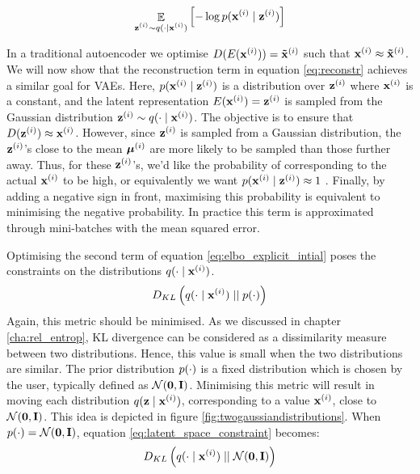 	\begin{equation}
		\mathop{\mathbb{E}}_{\substack{\mathbf{z}^{(i)} \sim q (\cdot \mid \mathbf{x}^{(i)})}} \left[ -\log p (\mathbf{x}^{(i)} \mid \mathbf{z}^{(i)}) \right] \label{eq:reconstr}	
	\end{equation}

	In a traditional autoencoder we optimise $D(E(\mathbf{x}^{(i)})) = \mathbf{\tilde{x}}^{(i)}$ such that $\mathbf{x}^{(i)} \approx \mathbf{\tilde{x}}^{(i)}$. We will now show that the reconstruction term in equation \ref{eq:reconstr} achieves a similar goal for VAEs. Here, $p (\mathbf{x}^{(i)} \mid \mathbf{z}^{(i)})$ is a distribution over $\mathbf{z}^{(i)}$ where $\mathbf{x}^{(i)}$ is a constant, and the latent representation $E(\mathbf{x}^{(i)}) = \mathbf{z}^{(i)}$ is sampled from the Gaussian distribution $\mathbf{z}^{(i)} \sim q (\cdot \mid \mathbf{x}^{(i)})$. The objective is to ensure that $D(\mathbf{z}^{(i)}) \approx \mathbf{x}^{(i)}$. However, since $\mathbf{z}^{(i)}$ is sampled from a Gaussian distribution, the $\mathbf{z}^{(i)}$'s close to the mean $\bm{\mu}^{(i)}$ are more likely to be sampled than those further away. Thus, for these $\mathbf{z}^{(i)}$'s, we'd like the probability of corresponding to the actual $\mathbf{x}^{(i)}$ to be high, or equivalently we want $p (\mathbf{x}^{(i)} \mid \mathbf{z}^{(i)}) \approx 1$ \citep{cinelliVariationalMethodsMachine2021}. Finally, by adding a negative sign in front, maximising this probability is equivalent to minimising the negative probability. In practice this term is approximated through mini-batches with the mean squared error. %
	

	Optimising the second term of equation \ref{eq:elbo_explicit_intial} poses the constraints on the distributions $q (\cdot \mid \mathbf{x}^{(i)})$. 
	\begin{equation}
		D_{KL} \left(  q (\cdot \mid \mathbf{x}^{(i)})  \mid \mid  p(\cdot)  \right) \label{eq:latent_space_constraint}		
	\end{equation}
	Again, this metric should be minimised. As we discussed in chapter \ref{cha:rel_entrop}, KL divergence can be considered as a dissimilarity measure between two distributions. Hence, this value is small when the two distributions are similar. The prior distribution $p(\cdot)$ is a fixed distribution which is chosen by the user, typically defined as $\mathcal{N}(\bm{\mathbf{0}}, \mathbf{I})$. Minimising this metric will result in moving each distribution $q (\mathbf{z} \mid \mathbf{x}^{(i)})$, corresponding to a value $\mathbf{x}^{(i)}$, close to $\mathcal{N}(\bm{\mathbf{0}}, \mathbf{I})$. This idea is depicted in figure \ref{fig:twogaussiandistributions}. When $p(\cdot) = \mathcal{N}(\bm{\mathbf{0}}, \mathbf{I})$, equation \ref{eq:latent_space_constraint} becomes:
	$$D_{KL} \left(  q (\cdot \mid \mathbf{x}^{(i)})  \mid \mid  \mathcal{N}(\bm{\mathbf{0}}, \mathbf{I})  \right)$$
	
